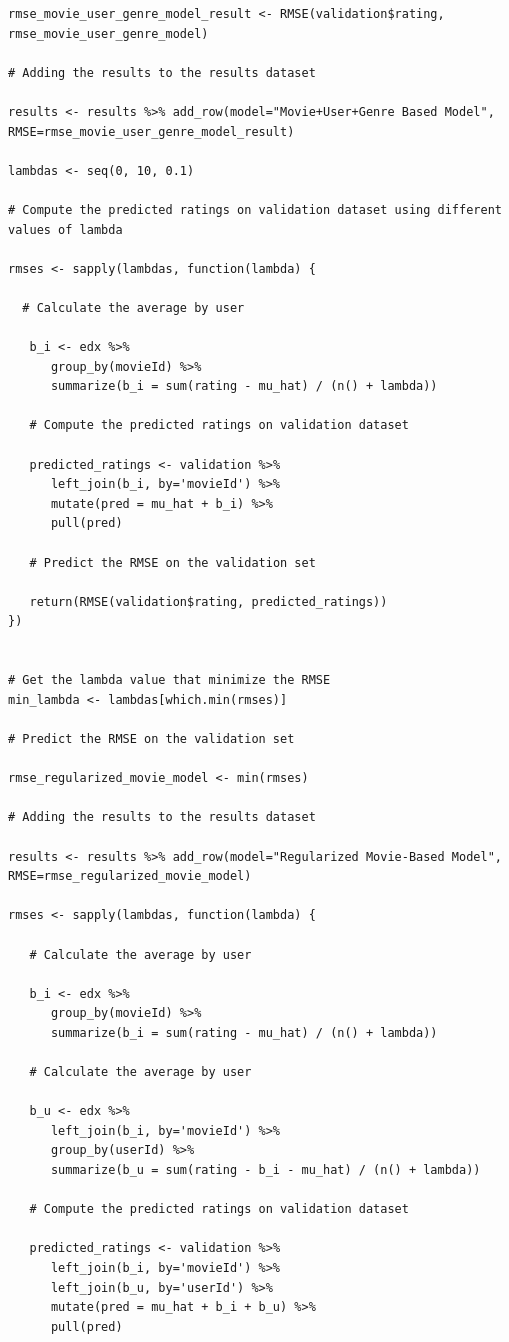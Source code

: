 \documentclass[]{article}
\begin{document}
\begin{verbatim}
rmse_movie_user_genre_model_result <- RMSE(validation$rating, rmse_movie_user_genre_model)

# Adding the results to the results dataset

results <- results %>% add_row(model="Movie+User+Genre Based Model", RMSE=rmse_movie_user_genre_model_result)

lambdas <- seq(0, 10, 0.1)

# Compute the predicted ratings on validation dataset using different values of lambda

rmses <- sapply(lambdas, function(lambda) {
   
  # Calculate the average by user
  
   b_i <- edx %>%
      group_by(movieId) %>%
      summarize(b_i = sum(rating - mu_hat) / (n() + lambda))
   
   # Compute the predicted ratings on validation dataset
   
   predicted_ratings <- validation %>%
      left_join(b_i, by='movieId') %>%
      mutate(pred = mu_hat + b_i) %>%
      pull(pred)
   
   # Predict the RMSE on the validation set
   
   return(RMSE(validation$rating, predicted_ratings))
})


# Get the lambda value that minimize the RMSE
min_lambda <- lambdas[which.min(rmses)]

# Predict the RMSE on the validation set

rmse_regularized_movie_model <- min(rmses)

# Adding the results to the results dataset

results <- results %>% add_row(model="Regularized Movie-Based Model", RMSE=rmse_regularized_movie_model)

rmses <- sapply(lambdas, function(lambda) {

   # Calculate the average by user
   
   b_i <- edx %>%
      group_by(movieId) %>%
      summarize(b_i = sum(rating - mu_hat) / (n() + lambda))
   
   # Calculate the average by user
   
   b_u <- edx %>%
      left_join(b_i, by='movieId') %>%
      group_by(userId) %>%
      summarize(b_u = sum(rating - b_i - mu_hat) / (n() + lambda))
   
   # Compute the predicted ratings on validation dataset
   
   predicted_ratings <- validation %>%
      left_join(b_i, by='movieId') %>%
      left_join(b_u, by='userId') %>%
      mutate(pred = mu_hat + b_i + b_u) %>%
      pull(pred)
   

\end{verbatim}
\end{document}
